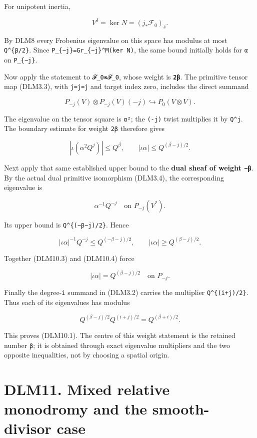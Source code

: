 \documentclass[
]{report}
\begin{document}
For unipotent inertia,

\[
V^I=\ker N=(j_*\mathcal F_0)_{\bar s}.
\]

By DLM8 every Frobenius eigenvalue on this space has modulus at most
\texttt{Q\^{}\{β/2\}}. Since \texttt{P\_\{−j\}=Gr\_\{−j\}\^{}M(ker\ N)},
the same bound initially holds for \texttt{α} on \texttt{P\_\{−j\}}.

Now apply the statement to \texttt{𝓕\_0⊗𝓕\_0}, whose weight is
\textbf{\texttt{2β}}. The primitive tensor map (DLM3.3), with
\texttt{j\textquotesingle{}=j\textquotesingle{}\textquotesingle{}=j} and
target index zero, includes the direct summand

\[
P_{-j}(V)\otimes P_{-j}(V)(-j)
\hookrightarrow P_0(V\otimes V).
\tag{DLM10.2}
\]

The eigenvalue on the tensor square is \texttt{α²}; the \texttt{(-j)}
twist multiplies it by \texttt{Q\^{}j}. The boundary estimate for weight
\texttt{2β} therefore gives

\[
|\iota(\alpha^2Q^j)|\le Q^{\beta},
\qquad
|\iota\alpha|\le Q^{(\beta-j)/2}.
\tag{DLM10.3}
\]

Next apply that same established upper bound to the \textbf{dual sheaf
of weight \texttt{−β}}. By the actual dual primitive isomorphism
(DLM3.4), the corresponding eigenvalue is

\[
\alpha^{-1}Q^{-j}\quad\text{on }P_{-j}(V^*).
\]

Its upper bound is \texttt{Q\^{}\{(−β−j)/2\}}. Hence

\[
|\iota\alpha|^{-1}Q^{-j}\le Q^{(-\beta-j)/2},
\qquad
|\iota\alpha|\ge Q^{(\beta-j)/2}.
\tag{DLM10.4}
\]

Together (DLM10.3) and (DLM10.4) force

\[
\boxed{|\iota\alpha|=Q^{(\beta-j)/2}\quad\text{on }P_{-j}.}
\tag{DLM10.5}
\]

Finally the degree-\texttt{i} summand in (DLM3.2) carries the multiplier
\texttt{Q\^{}\{(i+j)/2\}}. Thus each of its eigenvalues has modulus

\[
Q^{(\beta-j)/2}Q^{(i+j)/2}=Q^{(\beta+i)/2}.
\tag{DLM10.6}
\]

This proves (DLM10.1). The centre of this weight statement is the
retained number \texttt{β}; it is obtained through exact eigenvalue
multipliers and the two opposite inequalities, not by choosing a spatial
origin.

\section{DLM11. Mixed relative monodromy and the smooth-divisor
case}\label{dlm11.-mixed-relative-monodromy-and-the-smooth-divisor-case}
\end{document}
